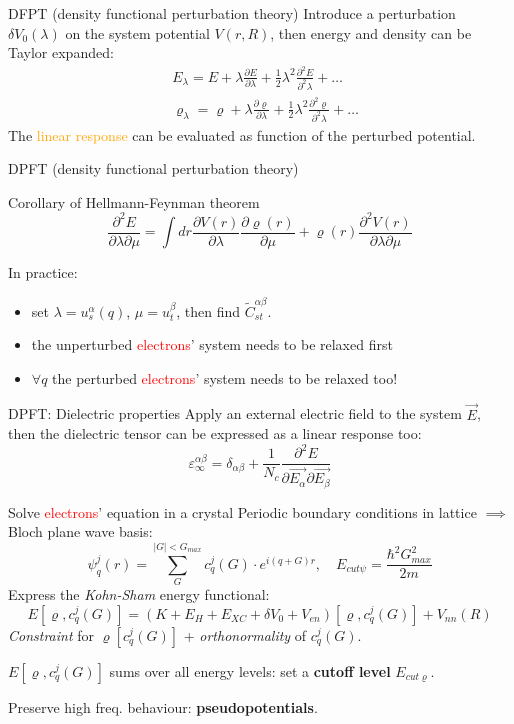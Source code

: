 \documentclass[dvipsnames]{beamer}
\newcommand{\diff}[2]{\frac{\partial #1}{\partial #2}}
\newcommand{\ddiff}[2]{\frac{\partial^2 #1}{\partial^2 #2}}
\newcommand{\ddiffd}[3]{\frac{\partial^2 #1}{\partial #2 \partial #3}}
\newcommand{\electrons}{\textcolor{red}{electrons}}
\begin{document}
		\begin{frame}{DFPT (density functional perturbation theory)}
		Introduce a perturbation $\delta V_0(\lambda)$ on the system potential $V(r,R)$, then energy and density can be Taylor expanded:
		\begin{align*}
		&E_\lambda = E + \lambda \diff{E}{\lambda} + \frac{1}{2} \lambda^2 \ddiff{E}{\lambda} + \dots \\
		&\varrho_\lambda = \varrho + \lambda \diff{\varrho}{\lambda} + \frac{1}{2} \lambda^2 \ddiff{\varrho}{\lambda} + \dots
		\end{align*}
		The \textcolor{orange}{linear response} can be evaluated as function of the perturbed potential.
		\end{frame}
		
		\begin{frame}{DPFT (density functional perturbation theory)}
		\begin{block}{Corollary of Hellmann-Feynman theorem}
		\[\ddiffd{E}{\lambda}{\mu} = \int dr \diff{V(r)}{\lambda} \diff{\varrho(r)}{\mu} + \varrho(r) \ddiffd{V(r)}{\lambda}{\mu}\]
		\end{block}
		\alert{In practice:} 
		\begin{itemize}
		\item set $\lambda = u_s^\alpha(q)$, $\mu = u_t^\beta$, then find $\tilde{C}_{st}^{\alpha\beta}$.
		\item the unperturbed \electrons ' system needs to be relaxed first
		\item $\forall q$ the perturbed \electrons ' system needs to be relaxed too!
		\end{itemize}
		\end{frame}
		
		\begin{frame}{DPFT: Dielectric properties}
		Apply an external electric field to the system $\vec{E}$, then the dielectric tensor can be expressed as a linear response too:
		\[ \varepsilon_\infty^{\alpha\beta} = \delta_{\alpha\beta} + \frac{1}{N_c} \ddiffd{E}{\vec{E_\alpha}}{\vec{E_\beta}} \]
		\end{frame}
		
		\begin{frame}{Solve \electrons ' equation in a crystal \cite{castep}}
		Periodic boundary conditions in lattice $\implies$ Bloch plane wave basis:
		\[\psi_q^j(r) = \sum_G^{|G| < G_{max}} c_{q}^j(G) \cdot e^{i(q+G)r}, \quad E_{cut\psi} = \frac{\hbar^2 G_{max}^2}{2m} \]
		Express the \textit{Kohn-Sham} energy  functional:
		\[ E[\varrho, c_{q}^j(G)] = (K + E_H + E_{XC} + \delta V_0 + V_{en})[\varrho, c_{q}^j(G)] + V_{nn}(R) \]
		\textit{Constraint} for $\varrho[c_{q}^j(G)]$ + \textit{orthonormality} of $c_{q}^j(G)$.
		\par
		\alert{$E[\varrho, c_{q}^j(G)]$ sums over all energy levels: set a \textbf{cutoff level} $E_{cut\varrho}$}.
		\par
		\alert{Preserve high freq. behaviour: \textbf{pseudopotentials}. \cite{castep}}
		\end{frame}
		
\end{document}
